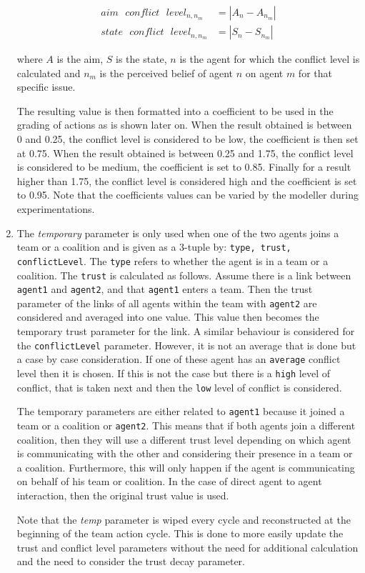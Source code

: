 \begin{enumerate}
\begin{equation}\begin{split}
aim \text{ } conflict \text{ } level_{n,n_m} &= |A_n - A_{n_m}| \\
state \text{ }conflict \text{ } level_{n,n_m} &= |S_n - S_{n_m}|
\end{split}\end{equation}

where $A$ is the aim, $S$ is the state, $n$ is the agent for which the conflict level is calculated and $n_m$ is the perceived belief of agent $n$ on agent $m$ for that specific issue.

The resulting value is then formatted into a coefficient to be used in the grading of actions as is shown later on. When the result obtained is between 0 and 0.25, the conflict level is considered to be low, the coefficient is then set at 0.75. When the result obtained is between 0.25 and 1.75, the conflict level is considered to be medium, the coefficient is set to 0.85. Finally for a result higher than 1.75, the conflict level is considered high and the coefficient is set to 0.95. Note that the coefficients values can be varied by the modeller during experimentations.

\item The \emph{temporary} parameter is only used when one of the two agents joins a team or a coalition and is given as a 3-tuple by: \texttt{type, trust, conflictLevel}. The \texttt{type} refers to whether the agent is in a team or a coalition. The \texttt{trust} is calculated as follows. Assume there is a link between \texttt{agent1} and \texttt{agent2}, and that \texttt{agent1} enters a team. Then the trust parameter of the links of all agents within the team with \texttt{agent2} are considered and averaged into one value. This value then becomes the temporary trust parameter for the link. A similar behaviour is considered for the \texttt{conflictLevel} parameter. However, it is not an average that is done but a case by case consideration. If one of these agent has an \texttt{average} conflict level then it is chosen. If this is not the case but there is a \texttt{high} level of conflict, that is taken next and then the \texttt{low} level of conflict is considered.

The temporary parameters are either related to \texttt{agent1} because it joined a team or a coalition or \texttt{agent2}. This means that if both agents join a different coalition, then they will use a different trust level depending on which agent is communicating with the other and considering their presence in a team or a coalition. Furthermore, this will only happen if the agent is communicating on behalf of his team or coalition. In the case of direct agent to agent interaction, then the original trust value is used.

Note that the \emph{temp} parameter is wiped every cycle and reconstructed at the beginning of the team action cycle. This is done to more easily update the trust and conflict level parameters without the need for additional calculation and the need to consider the trust decay parameter. 



\end{enumerate}

